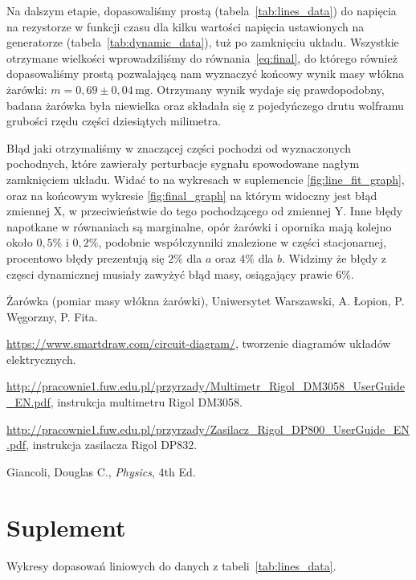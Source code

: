 \documentclass[12pt]{article}
\begin{document}
Na dalszym etapie, dopasowaliśmy prostą (tabela~\ref{tab:lines_data}) do napięcia na rezystorze w funkcji czasu dla kilku wartości napięcia ustawionych na generatorze (tabela~\ref{tab:dynamic_data}), tuż po zamknięciu układu. Wszystkie otrzymane wielkości wprowadziliśmy do równania~\eqref{eq:final}, do którego również dopasowaliśmy prostą pozwalającą nam wyznaczyć końcowy wynik masy włókna żarówki: $m=0{,}69\pm0{,}04\,\mathrm{mg}$. Otrzymany wynik wydaje się prawdopodobny, badana żarówka była niewielka oraz składała się z pojedyńczego drutu wolframu grubości rzędu części dziesiątych milimetra.

Błąd jaki otrzymaliśmy w znaczącej części pochodzi od wyznaczonych pochodnych, które zawierały perturbacje sygnału spowodowane nagłym zamknięciem układu. Widać to na wykresach w suplemencie \ref{fig:line_fit_graph}, oraz na końcowym wykresie \ref{fig:final_graph} na którym widoczny jest błąd zmiennej X, w przeciwieństwie do tego pochodzącego od zmiennej Y. Inne błędy napotkane w równaniach są marginalne, opór żarówki i opornika mają kolejno około $0{,}5 \%$ i $0{,}2 \%$, podobnie współczynniki znalezione w części stacjonarnej, procentowo błędy prezentują się $2\%$ dla $a$ oraz $4\%$ dla $b$. Widzimy że błędy z częsci dynamicznej musiały zawyżyć błąd masy, osiągający prawie $6\%$.


\newpage
\begin{thebibliography}{6}

Żarówka (pomiar masy włókna żarówki), Uniwersytet Warszawski, A. Łopion, P. Węgorzny, P. Fita.

\url{https://www.smartdraw.com/circuit-diagram/}, tworzenie diagramów układów elektrycznych.

\url{http://pracownie1.fuw.edu.pl/przyrzady/Multimetr_Rigol_DM3058_UserGuide_EN.pdf}, instrukcja multimetru Rigol DM3058.

\url{http://pracownie1.fuw.edu.pl/przyrzady/Zasilacz_Rigol_DP800_UserGuide_EN.pdf}, instrukcja zasilacza Rigol DP832.

Giancoli, Douglas C., \emph{Physics}, 4th Ed.

\end{thebibliography}

\newpage

\section{Suplement}
Wykresy dopasowań liniowych do danych z tabeli~\ref{tab:lines_data}.
\end{document}
